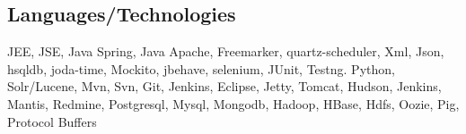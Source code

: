 

\subsection{Languages/Technologies}

\cventry
    {}{JEE, JSE, Java Spring, Java Apache, Freemarker, quartz-scheduler, Xml, Json, hsqldb, joda-time, Mockito, jbehave, selenium, JUnit, Testng. Python,
    Solr/Lucene, Mvn, Svn, Git, Jenkins, Eclipse, Jetty, Tomcat, Hudson, Jenkins, Mantis, Redmine, Postgresql, Mysql, Mongodb, Hadoop, HBase, Hdfs, Oozie,
    Pig, Protocol Buffers}{}{}{}{}
